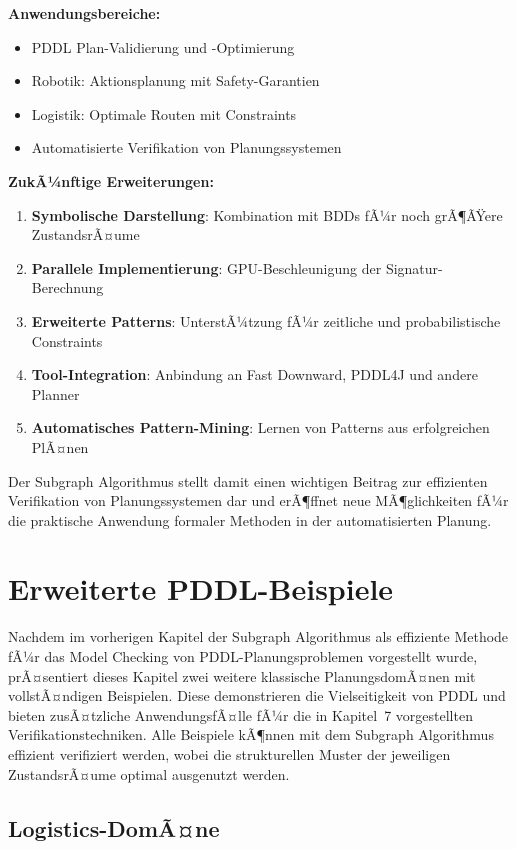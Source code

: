 ﻿\documentclass[a4paper,12pt]{article}
\theoremstyle{definition}
\begin{document}
\textbf{Anwendungsbereiche:}
\begin{itemize}
	\item[-] PDDL Plan-Validierung und -Optimierung
	\item[-] Robotik: Aktionsplanung mit Safety-Garantien
	\item[-] Logistik: Optimale Routen mit Constraints
	\item[-] Automatisierte Verifikation von Planungssystemen
\end{itemize}

\textbf{ZukÃ¼nftige Erweiterungen:}
\begin{enumerate}
	\item \textbf{Symbolische Darstellung}: Kombination mit BDDs fÃ¼r noch grÃ¶ÃŸere ZustandsrÃ¤ume
	\item \textbf{Parallele Implementierung}: GPU-Beschleunigung der Signatur-Berechnung
	\item \textbf{Erweiterte Patterns}: UnterstÃ¼tzung fÃ¼r zeitliche und probabilistische Constraints
	\item \textbf{Tool-Integration}: Anbindung an Fast Downward, PDDL4J und andere Planner
	\item \textbf{Automatisches Pattern-Mining}: Lernen von Patterns aus erfolgreichen PlÃ¤nen
\end{enumerate}

Der Subgraph Algorithmus stellt damit einen wichtigen Beitrag zur effizienten Verifikation von Planungssystemen dar und erÃ¶ffnet neue MÃ¶glichkeiten fÃ¼r die praktische Anwendung formaler Methoden in der automatisierten Planung.

\section{Erweiterte PDDL-Beispiele}

Nachdem im vorherigen Kapitel der Subgraph Algorithmus als effiziente Methode fÃ¼r das Model Checking von PDDL-Planungsproblemen vorgestellt wurde, prÃ¤sentiert dieses Kapitel zwei weitere klassische PlanungsdomÃ¤nen mit vollstÃ¤ndigen Beispielen. Diese demonstrieren die Vielseitigkeit von PDDL und bieten zusÃ¤tzliche AnwendungsfÃ¤lle fÃ¼r die in Kapitel~7 vorgestellten Verifikationstechniken. Alle Beispiele kÃ¶nnen mit dem Subgraph Algorithmus effizient verifiziert werden, wobei die strukturellen Muster der jeweiligen ZustandsrÃ¤ume optimal ausgenutzt werden.

\subsection{Logistics-DomÃ¤ne}
\end{document}
